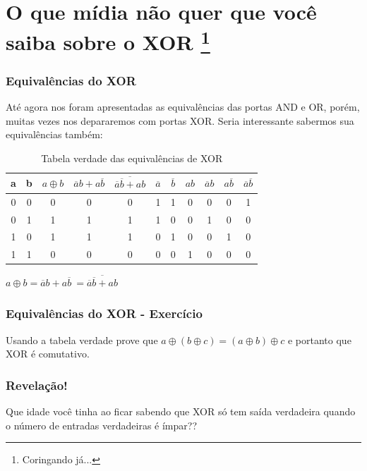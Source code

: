 \section{O que mídia não quer que você saiba sobre o XOR \footnote[frame]{Coringando já...}}

\begin{frame}
	\frametitle{Equivalências do XOR}
	\par Até agora nos foram apresentadas as equivalências das portas AND e OR, porém, muitas vezes nos depararemos com portas XOR. Seria interessante sabermos sua equivalências também:
	
	\begin{table}[h!]
		\centering
		\begin{tabular}{|c|c|c|c|c|c|c|c|c|c|c|}
			\hline
			a & b & \(a \oplus b\) & \(\overline{a}b + a\overline{b}\) & \(\overline{\overline{a}\overline{b} + ab}\) & \(\overline{a}\) & \(\overline{b}\) & \(ab\) & \(\overline{a}b\) & \(a\overline{b}\) & \(\overline{a}\overline{b}\) \\ \hline
			0 & 0 & 0 & 0 & 0 & 1 & 1 & 0 & 0 & 0 & 1 \\ \hline
			0 & 1 & 1 & 1 & 1 & 1 & 0 & 0 & 1 & 0 & 0 \\ \hline
			1 & 0 & 1 & 1 & 1 & 0 & 1 & 0 & 0 & 1 & 0 \\ \hline
			1 & 1 & 0 & 0 & 0 & 0 & 0 & 1 & 0 & 0 & 0 \\ \hline
		\end{tabular}
		\caption{Tabela verdade das equivalências de XOR}
		\label{tab:equivalXOR}
	\end{table}
	
	\par $a \oplus b = \overline{a}b + a\overline{b}\ = \overline{\overline{a}\overline{b} + ab}$
	
\end{frame}

\begin{frame}
	\frametitle{Equivalências do XOR - Exercício}
	\par Usando a tabela verdade prove que $a \oplus (b \oplus c) = (a \oplus b) \oplus c$ e portanto que XOR é comutativo.
\end{frame}

\begin{frame}
	\frametitle{Revelação!}
	\par Que idade você tinha ao ficar sabendo que XOR só tem saída verdadeira quando o número de entradas verdadeiras é ímpar??
\end{frame}














